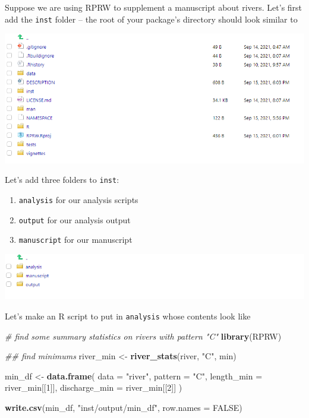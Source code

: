 \documentclass[
]{book}
\newenvironment{Shaded}{\begin{snugshade}}{\end{snugshade}}
\newcommand{\CommentTok}[1]{\textcolor[rgb]{0.56,0.35,0.01}{\textit{#1}}}
\newcommand{\DataTypeTok}[1]{\textcolor[rgb]{0.13,0.29,0.53}{#1}}
\newcommand{\DecValTok}[1]{\textcolor[rgb]{0.00,0.00,0.81}{#1}}
\newcommand{\KeywordTok}[1]{\textcolor[rgb]{0.13,0.29,0.53}{\textbf{#1}}}
\newcommand{\NormalTok}[1]{#1}
\newcommand{\OtherTok}[1]{\textcolor[rgb]{0.56,0.35,0.01}{#1}}
\newcommand{\StringTok}[1]{\textcolor[rgb]{0.31,0.60,0.02}{#1}}
\providecommand{\tightlist}{%
  \setlength{\itemsep}{0pt}\setlength{\parskip}{0pt}}
\begin{document}
Suppose we are using RPRW to supplement a manuscript about rivers. Let's first add the \texttt{inst} folder -- the root of your package's directory should look similar to

\includegraphics[width=1\linewidth]{images/newrpack_files9}

Let's add three folders to \texttt{inst}:

\begin{enumerate}
\def\labelenumi{\arabic{enumi}.}
\tightlist
\item
  \texttt{analysis} for our analysis scripts
\item
  \texttt{output} for our analysis output
\item
  \texttt{manuscript} for our manuscript
\end{enumerate}

\includegraphics[width=1\linewidth]{images/newrpack_files10}

Let's make an R script to put in \texttt{analysis} whose contents look like

\begin{Shaded}
\begin{Highlighting}[]
\CommentTok{# find some summary statistics on rivers with pattern "C"}
\KeywordTok{library}\NormalTok{(RPRW)}

\CommentTok{## find minimums}
\NormalTok{river_min <-}\StringTok{ }\KeywordTok{river_stats}\NormalTok{(river, }\StringTok{"C"}\NormalTok{, min)}

\NormalTok{min_df <-}\StringTok{ }\KeywordTok{data.frame}\NormalTok{(}
  \DataTypeTok{data =} \StringTok{"river"}\NormalTok{,}
  \DataTypeTok{pattern =} \StringTok{"C"}\NormalTok{,}
  \DataTypeTok{length_min =}\NormalTok{ river_min[[}\DecValTok{1}\NormalTok{]],}
  \DataTypeTok{discharge_min =}\NormalTok{ river_min[[}\DecValTok{2}\NormalTok{]]}
\NormalTok{)}

\KeywordTok{write.csv}\NormalTok{(min_df, }\StringTok{"inst/output/min_df"}\NormalTok{, }\DataTypeTok{row.names =} \OtherTok{FALSE}\NormalTok{)}
\end{Highlighting}
\end{Shaded}
\end{document}
